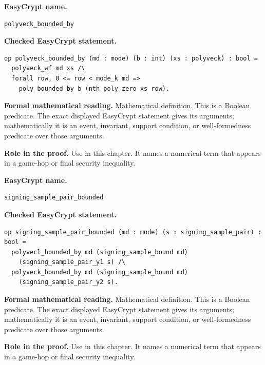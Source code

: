\begin{formaldefinition}
\noindent\textbf{EasyCrypt name.}
\begin{lstlisting}[language=EasyCrypt,basicstyle=\ttfamily\scriptsize]
polyveck_bounded_by
\end{lstlisting}
\noindent\textbf{Checked EasyCrypt statement.}
\begin{lstlisting}[language=EasyCrypt,basicstyle=\ttfamily\scriptsize]
op polyveck_bounded_by (md : mode) (b : int) (xs : polyveck) : bool =
  polyveck_wf md xs /\
  forall row, 0 <= row < mode_k md =>
    poly_bounded_by b (nth poly_zero xs row).
\end{lstlisting}
\noindent\textbf{Formal mathematical reading.}
Mathematical definition. This is a Boolean predicate.  The exact displayed EasyCrypt statement gives its arguments; mathematically it is an event, invariant, support condition, or well-formedness predicate over those arguments.

\noindent\textbf{Role in the proof.}
Use in this chapter. It names a numerical term that appears in a game-hop or final security inequality.

\end{formaldefinition}

\begin{formaldefinition}
\noindent\textbf{EasyCrypt name.}
\begin{lstlisting}[language=EasyCrypt,basicstyle=\ttfamily\scriptsize]
signing_sample_pair_bounded
\end{lstlisting}
\noindent\textbf{Checked EasyCrypt statement.}
\begin{lstlisting}[language=EasyCrypt,basicstyle=\ttfamily\scriptsize]
op signing_sample_pair_bounded (md : mode) (s : signing_sample_pair) : bool =
  polyvecl_bounded_by md (signing_sample_bound md)
    (signing_sample_pair_y1 s) /\
  polyveck_bounded_by md (signing_sample_bound md)
    (signing_sample_pair_y2 s).
\end{lstlisting}
\noindent\textbf{Formal mathematical reading.}
Mathematical definition. This is a Boolean predicate.  The exact displayed EasyCrypt statement gives its arguments; mathematically it is an event, invariant, support condition, or well-formedness predicate over those arguments.

\noindent\textbf{Role in the proof.}
Use in this chapter. It names a numerical term that appears in a game-hop or final security inequality.

\end{formaldefinition}

